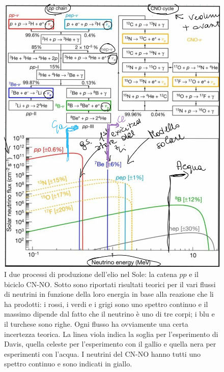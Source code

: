 \begin{figure}[h]
    \centering
    \includegraphics[scale=0.2]{Immagini/0322_neutrini.png}
    \caption[I due processi di produzione dell'elio nel Sole: la catena $pp$ e il biciclo CN-NO. Sotto sono riportati risultati teorici per il vari flussi di neutrini in funzione della loro energia in base alla reazione che li ha prodotti: i rossi, i verdi e i grigi sono uno spettro continuo e il massimo dipende dal fatto che il neutrino è uno di tre corpi; i blu e il turchese sono righe. Ogni flusso ha ovviamente una certa incertezza teorica. La linea viola indica la soglia per l'esperimento di Davis, quella celeste per l'esperimento con il gallio e quella nera per esperimenti con l'acqua. I neutrini del CN-NO hanno tutti uno spettro continuo e sono indicati in giallo.]{I due processi di produzione dell'elio nel Sole: la catena $pp$ e il biciclo CN-NO\footnotemark. Sotto sono riportati risultati teorici per il vari flussi di neutrini in funzione della loro energia in base alla reazione che li ha prodotti: i rossi, i verdi e i grigi sono uno spettro continuo e il massimo dipende dal fatto che il neutrino è uno di tre corpi; i blu e il turchese sono righe. Ogni flusso ha ovviamente una certa incertezza teorica. La linea viola indica la soglia per l'esperimento di Davis, quella celeste per l'esperimento con il gallio e quella nera per esperimenti con l'acqua. I neutrini del CN-NO hanno tutti uno spettro continuo e sono indicati in giallo.}
    \label{0322_nu}
\end{figure}
